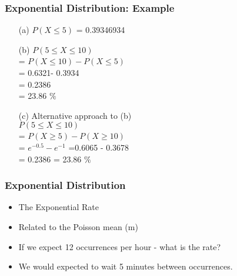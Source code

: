 
\begin{frame}[fragile]
\frametitle{Exponential Distribution: Example}

\begin{itemize}
\item[(a)] $P(X \leq 5)$ = 0.39346934
\item[(b)] $P(5 \leq X \leq 10)$ \\ = $P( X \leq 10) - P( X \leq 5)$ \\ = 0.6321- 0.3934 \\ = 0.2386 \\= 23.86 $\%$
\item[(c)] Alternative approach to (b)\\$P(5 \leq X \leq 10)$ \\ = $P( X \geq 5) - P( X \geq 10)$ \\
= $e^{-0.5} - e^{-1}$
=0.6065 - 0.3678\\
= 0.2386 = 23.86 $\%$
\end{itemize}

\end{frame}



\begin{frame}[fragile]
\frametitle{Exponential Distribution}
\begin{itemize}
\item The Exponential Rate
\item Related to the Poisson mean (m)
\item If we expect 12 occurrences per hour - what is the rate?
\item We would expected to wait 5 minutes between occurrences.
\end{itemize}
\end{frame}
